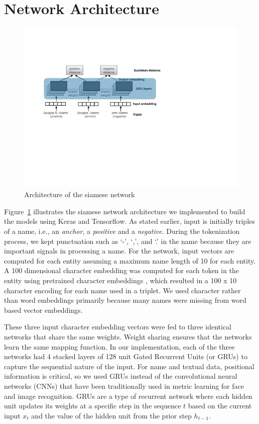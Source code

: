 \section{Network Architecture}
\label{architecture}
\begin{figure}
\includegraphics[width=1.0\linewidth]{triplet_siamese_network}
\caption{Architecture of the siamese network}
\label{siamese_nets}
\end{figure}

Figure~\ref{siamese_nets} illustrates the siamese network architecture \cite{DBLP:conf/cvpr/SchroffKP15} we implemented to build the models using Keras and Tensorflow.  As stated earlier, input is initially triples of a name, i.e., an \textit{anchor}, a \textit{positive} and a \textit{negative}.  During the tokenization process, we kept punctuation such as `-', `,', and `.' in the name because they are important signals in processing a name.  For the network, input vectors are computed for each entity assuming a maximum name length of 10 for each entity.  A 100 dimensional character embedding was computed for each token in the entity using pretrained character embeddings \cite{hashimoto-jmt:2017:EMNLP2017}, which resulted in a 100 x 10 character encoding for each name used in a triplet.  We used character rather than word embeddings primarily because many names were missing from word based vector embeddings.

These three input character embedding vectors were fed to three identical networks that share the same weights.  Weight sharing ensures that the networks learn the same mapping function.  In our implementation, each of the three networks had 4 stacked layers of 128 unit Gated Recurrent Units (or GRUs) to capture the sequential nature of the input.  For name and textual data, positional information is critical, so we used GRUs instead of the convolutional neural networks (CNNs) that have been traditionally used in metric learning for face and image recognition. GRUs are a type of recurrent network \cite{cho-al-emnlp14} where each hidden unit updates its weights at a specific step in the sequence $t$ based on the current input $x_t$ and the value of the hidden unit from the prior step $h_{t-1}$.  

